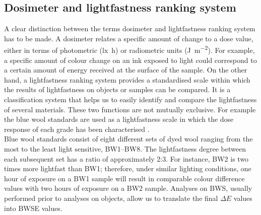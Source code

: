 \subsection{Dosimeter and lightfastness ranking system}
\label{sec:dosimeter}

A clear distinction between the terms dosimeter and lightfastness ranking system has to be made. A dosimeter relates a specific amount of change to a dose value, either in terms of photometric (\unit{\lux\hour}) or radiometric units (\unit{\joule\per\square\metre}). For example, a specific amount of colour change on an ink exposed to light could correspond to a certain amount of energy received at the surface of the sample. On the other hand, a lightfastness ranking system provides a standardised scale within which the results of lightfastness on objects or samples can be compared. It is a classification system that helps us to easily identify and compare the lightfastness of several materials. These two functions are not mutually exclusive. For example the blue wool standards are used as a lightfastness scale in which the dose response of each grade has been characterised \citep{michalski_light_2018}.\\

Blue wool standards consist of eight different sets of dyed wool ranging from the most to the least light sensitive, BW1–BW8. The lightfastness degree between each subsequent set has a ratio of approximately 2:3. For instance, BW2 is two times more lightfast than BW1; therefore, under similar lighting conditions, one hour of exposure on a BW1 sample will result in comparable colour difference values with two hours of exposure on a BW2 sample. Analyses on \gls{BWS}, usually performed prior to analyses on objects, allow us to translate the final $\Delta E$ values into \gls{BWSE} values.\\


